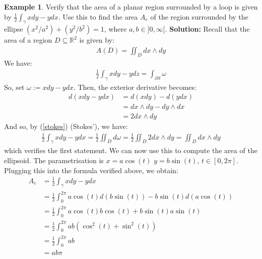 \documentclass[11pt]{scrartcl}
\newcommand{\R}[0]{\mathbb{R}}
\theoremstyle{definition}
\newtheorem{ex}{Example}
\theoremstyle{remark}
\newcommand{\idx}[2]{\int_{#1}^{#2}}
\begin{document}
{\begin{ex} 
	Verify that the area of a planar region surrounded by a loop is given by $\frac{1}{2} \idx{\gamma}{} x dy - y dx$. Use this to find the area $A_e$ of the region surrounded by the ellipse $(x^2/a^2) + (y^2 / b^2) =1$, where $a, b \in ]0, \infty[$. 
	\newline
	\newline
	\textbf{Solution:} Recall that the area of a region $D \subseteq \R^2$ is given by: 
	\begin{align}	
		A(D) = \iint_D dx \wedge dy 	
	\end{align}
	We have: 
	\begin{align*}
		\frac{1}{2} \idx{\gamma}{} x dy - y dz = \idx{\partial S}{} \omega 
	\end{align*}
	So, set $\omega := x dy - y dx$. Then, the exterior derivative becomes: 
	\begin{align*}
		d(xdy - ydx) & = d(xdy) - d(ydx) \\
					& = dx \wedge dy - dy \wedge dx \\
					& = 2 dx \wedge dy 
	\end{align*}
	And so, by (\ref{stokes}) (Stokes'), we have: 
	\begin{align}
		\frac{1}{2} \idx{\gamma}{} x dy - y dx = \frac{1}{2} \iint_D d \omega = \frac{1}{2} \iint_D 2 dx \wedge dy = \iint_D dx \wedge dy 	
	\end{align}
	which verifies the first statement. We can now use this to compute the area of the ellipsoid. The parametrisation is $x = a \cos (t)$ $y = b \sin (t)$, $t \in [0, 2 \pi ]$. Plugging this into the formula verified above, we obtain: 
	\begin{align*}
		A_e & = \frac{1}{2} \idx{\gamma}{} x dy - y dx \\
		&  = \frac{1}{2} \idx{0}{2 \pi} a \cos ( t ) d (b \sin (t) ) - b \sin (t) d ( a \cos (t) ) \\
		& = \frac{1}{2} \idx{0}{2 \pi} a \cos (t) b \cos(t) + b \sin (t) a \sin (t) \\
		& = \frac{1}{2} \idx{0}{ 2 \pi} ab (\cos^2 (t) + \sin ^2 (t) ) \\
		& = \frac{1}{2} \idx{0}{ 2 \pi} ab \\
		& = ab \pi 
	\end{align*}
\end{ex}

}
\end{document}
